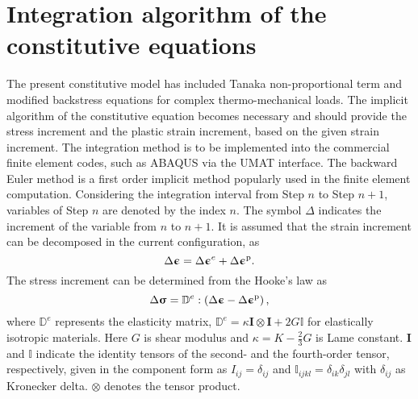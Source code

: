 \documentclass[preprint,5p,twocolumn,11pt,sort&compress]{elsarticle}
\newcommand{\bfsigma}{{\bm{\upsigma}}}
\newcommand{\bfepsilon}{{\bm{\upepsilon}}}
\begin{document}
\section{Integration algorithm of the constitutive equations}
\noindent
The present constitutive model has included Tanaka non-proportional term and modified backstress equations for complex thermo-mechanical loads. The implicit algorithm of the constitutive equation becomes necessary and should provide the stress increment and the plastic strain increment, based on the given strain increment. The integration method is to be implemented into the commercial finite element codes, such as ABAQUS via the UMAT interface.
The backward Euler method is a first order implicit method popularly used in the finite element computation. Considering the integration interval from Step $n$ to Step $n+1$, variables of Step $n$ are denoted by the index $n$. The symbol $\Delta$ indicates the increment of the variable from $n$ to $n+1$. It is assumed that the strain increment can be decomposed in the current configuration, as
\begin{equation}
{\Delta\bfepsilon} = \Delta\bfepsilon^e + \Delta\bfepsilon^{\rm p}.
\end{equation}
The stress increment can be determined from the Hooke's law as
\begin{equation}
\label{Equ:sigman+1}
\Delta\bfsigma= {\mathbb{D}^e}:\left( {{\Delta\bfepsilon} - \Delta\bfepsilon^{\rm p}} \right),
\end{equation}
where $\mathbb{D}^e$ represents the elasticity matrix, ${\mathbb{D}^e} = \kappa {\mathbf{I}} \otimes {\mathbf{I}} + 2G\mathbb{I}$ for elastically isotropic materials. Here $G$ is shear modulus and  $\kappa  = K - \frac{2}{3}G$  is Lame constant. ${\mathbf{I}}$ and $\mathbb{I}$ indicate the identity tensors of the second- and the fourth-order tensor, respectively, given in the component form as ${I_{ij}} = {\delta _{ij}}$ and ${\mathbb{I}_{ijkl}} = {\delta _{ik}}{\delta _{jl}}$ with ${\delta _{ij}}$ as Kronecker delta. $\otimes$ denotes the tensor product.
\end{document}
